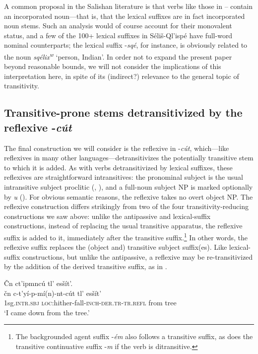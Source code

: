 \documentclass[output=paper,colorlinks,citecolor=brown]{langscibook}
\begin{document}
A common proposal in the Salishan literature is that verbs like those
in -- contain an incorporated noun---that is, that the lexical
suffixes are in fact incorporated noun stems.  Such an analysis would
of course account for their monovalent status, and a few of the 100+
lexical suffixes in S\'eli\v{s}-Ql'isp\'e have full-word nominal
counterparts; the lexical suffix -\emph{sq\'e}, for instance, is
obviously related to the noun \emph{sq\'elix\textsuperscript w}
`person, Indian'.  In order not to expand the present paper beyond
reasonable bounds, we will not consider the implications of this
interpretation here, in spite of its (indirect?) relevance to the
general topic of transitivity.

\subsection{Transitive-prone stems detransitivized by the reflexive
 -\emph{c\'ut}}   %
\label{thomason_section_2.9}

The final construction we will consider is the reflexive in
-\emph{c\'ut}, which---like reflexives in many other
languages---detransitivizes the potentially transitive stem to which
it is added.  As with verbs detransitivized by lexical suffixes, these
reflexives are straightforward intransitives: the pronominal subject
is the usual intransitive subject proclitic (, ), and a full-noun
subject NP is marked optionally by \emph{{\textltilde}u} ().  For
obvious semantic reasons, the reflexive takes no overt object NP.  The
reflexive construction differs strikingly from two of the four
transitivity-reducing constructions we saw above: unlike the
antipassive and lexical-suffix constructions, instead of replacing the
usual transitive apparatus, the reflexive suffix is added to it,
immediately after the transitive suffix.\footnote{The backgrounded
agent suffix -\emph{\'em} also follows a transitive suffix, as does
the transitive continuative suffix -\emph{m} if the verb is
ditransitive.}  In other words, the reflexive suffix replaces the
(object and) transitive subject suffix(es).  Like lexical-suffix
constructions, but unlike the antipassive, a reflexive may be
re-transitivized by the addition of the derived transitive suffix, as
in .

\ea 
\label{ex-thomason-41}
\v{C}n ct'ipmnc\'u tl' es\v{s}\'it'.  \\
\gll \v{c}n c-t'y\'i-p-m\'i(n)-nt-c\'ut tl' es\v{s}\'it' \\
1sg.\textsc{intr.sbj} \textsc{loc}:hither-fall-\textsc{inch-der.tr-tr.refl} from tree \\
\glt `I came down from the tree.'
\z
\end{document}
